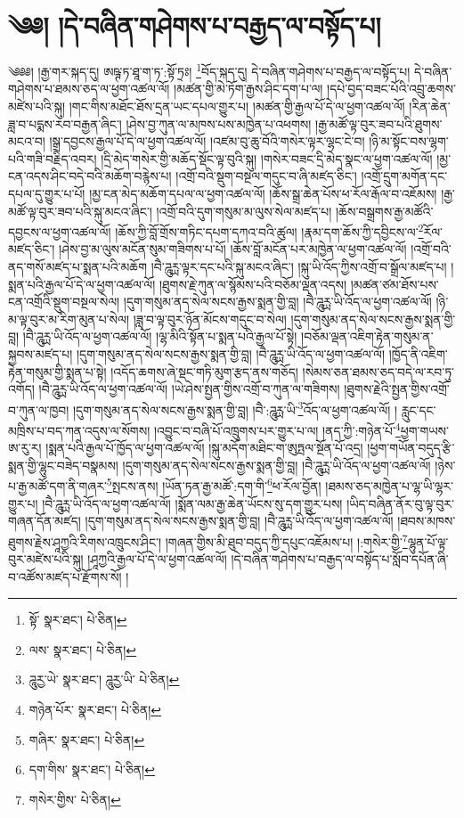 \setcounter{footnote}{0} 
\chapter{༄༅། །དེ་བཞིན་གཤེགས་པ་བརྒྱད་ལ་བསྟོད་པ།}༄༅༅། །རྒྱ་གར་སྐད་དུ། ཨཥྚ་ཏ་ཐཱ་ག་ཏ་:སྟོ་ཏྲཿ། \footnote{སྟོ་  སྣར་ཐང་།  པེ་ཅིན། }བོད་སྐད་དུ། དེ་བཞིན་གཤེགས་པ་བརྒྱད་ལ་བསྟོད་པ། དེ་བཞིན་གཤེགས་པ་ཐམས་ཅད་ལ་ཕྱག་འཚལ་ལོ། །མཚན་གྱི་མེ་ཏོག་རྒྱས་ཤིང་དག་པ་ལ། །དཔེ་བྱད་བཟང་པོའི་འབྲུ་ཆགས་མཛེས་པའི་སྐུ། །གང་གིས་མཐོང་ཐོས་དྲན་ཡང་དཔལ་གྱུར་པ། །མཚན་གྱི་རྒྱལ་པོ་དེ་ལ་ཕྱག་འཚལ་ལོ། །རིན་ཆེན་ཟླ་བ་པདྨས་རབ་བརྒྱན་ཞིང་། །ཤེས་བྱ་ཀུན་ལ་མཁས་པས་མཁྱེན་པ་འཕགས། །རྒྱ་མཚོ་ལྟ་བུར་ཟབ་པའི་ཐུགས་མངའ་བ། །སྒྲ་དབྱངས་རྒྱལ་པོ་དེ་ལ་ཕྱག་འཚལ་ལོ། །འཛམ་བུ་ཆུ་བོའི་གསེར་ལྟར་ལྷང་ངེ་བ། །ཉི་མ་སྟོང་བས་ལྷག་པའི་གཟི་བརྗིད་འབར། །དྲི་མེད་གསེར་གྱི་མཆོད་སྡོང་ལྟ་བུའི་སྐུ། །གསེར་བཟང་དྲི་མེད་སྣང་ལ་ཕྱག་འཚལ་ལོ། །མྱ་ངན་འདས་ཤིང་བདེ་བའི་མཆོག་བརྙེས་པ། །འགྲོ་བའི་སྡུག་བསྔལ་གདུང་བ་ཞི་མཛད་ཅིང་། །འགྲོ་དྲུག་མགོན་དང་དཔལ་དུ་གྱུར་པ་པོ། །མྱ་ངན་མེད་མཆོག་དཔལ་ལ་ཕྱག་འཚལ་ལོ། །ཆོས་སྒྲ་ཆེན་པོས་ཕ་རོལ་རྒོལ་བ་འཇོམས། །རྒྱ་མཚོ་ལྟ་བུར་ཟབ་པའི་སྐུ་མངའ་ཞིང་། །འགྲོ་བའི་དུག་གསུམ་མ་ལུས་སེལ་མཛད་པ། །ཆོས་བསྒྲགས་རྒྱ་མཚོའི་དབྱངས་ལ་ཕྱག་འཚལ་ལོ། །ཆོས་ཀྱི་བློ་གྲོས་གཏིང་དཔག་དཀའ་བའི་ཚུལ། །རྣམ་དག་ཆོས་ཀྱི་དབྱིངས་ལ་\footnote{ལས་  སྣར་ཐང་།  པེ་ཅིན། }རོལ་མཛད་ཅིང་། །ཤེས་བྱ་མ་ལུས་མངོན་སུམ་གཟིགས་པ་པོ། །ཆོས་བློ་མངོན་པར་མཁྱེན་ལ་ཕྱག་འཚལ་ལོ། །འགྲོ་བའི་ནད་གསོ་མཛད་པ་སྨན་པའི་མཆོག །བཻ་ཌཱུཪྻ་ལྟར་དང་པའི་སྐུ་མངའ་ཞིང་། །སྐུ་ཡི་འོད་ཀྱིས་འགྲོ་བ་སྒྲོལ་མཛད་པ། །སྨན་པའི་རྒྱལ་པོ་དེ་ལ་ཕྱག་འཚལ་ལོ། །ཐུགས་རྗེ་ཀུན་ལ་སྙོམས་པའི་བཅོམ་ལྡན་འདས། །མཚན་ཙམ་ཐོས་པས་ངན་འགྲོའི་སྡུག་བསྔལ་སེལ། །དུག་གསུམ་ནད་སེལ་སངས་རྒྱས་སྨན་གྱི་བླ། །བཻ་ཌཱུཪྻ་ཡི་འོད་ལ་ཕྱག་འཚལ་ལོ། །ཉི་མ་ལྟ་བུར་མ་རིག་མུན་པ་སེལ། །ཟླ་བ་ལྟ་བུར་ཉོན་མོངས་གདུང་བ་སེལ། །དུག་གསུམ་ནད་སེལ་སངས་རྒྱས་སྨན་གྱི་བླ། །བཻ་ཌཱུཪྻ་ཡི་འོད་ལ་ཕྱག་འཚལ་ལོ། །ལྷ་མིའི་སྟོན་པ་སྨན་པའི་རྒྱལ་པོ་སྟེ། །བཅོམ་ལྡན་འཇིག་རྟེན་གསུམ་ན་སྐྱབས་མཛད་པ། །དུག་གསུམ་ནད་སེལ་སངས་རྒྱས་སྨན་གྱི་བླ། །བཻ་ཌཱུཪྻ་ཡི་འོད་ལ་ཕྱག་འཚལ་ལོ། །ཁྱོད་ནི་འཇིག་རྟེན་གསུམ་གྱི་སྨན་པ་སྟེ། །འདོད་ཆགས་ཞེ་སྡང་གཏི་མུག་རྩད་ནས་གཅོད། །སེམས་ཅན་ཐམས་ཅད་བདེ་ལ་རབ་ཏུ་འགོད། །བཻ་ཌཱུཪྻ་ཡི་འོད་ལ་ཕྱག་འཚལ་ལོ། །ཡེ་ཤེས་སྤྱན་གྱིས་འགྲོ་བ་ཀུན་ལ་གཟིགས། །ཐུགས་རྗེའི་སྤྱན་གྱིས་འགྲོ་བ་ཀུན་ལ་ཁྱབ། །དུག་གསུམ་ནད་སེལ་སངས་རྒྱས་སྨན་གྱི་བླ། །བཻ་:ཌཱུཪྻ་ཡི་\footnote{ཌཱུརྱ་ཡེ་  སྣར་ཐང་། ཌཱུརྱ་ཡི་  པེ་ཅིན། }འོད་ལ་ཕྱག་འཚལ་ལོ། །
རླུང་དང་མཁྲིས་པ་བད་ཀན་འདུས་ལ་སོགས། །འབྱུང་བ་བཞི་པོ་འཁྲུགས་པར་གྱུར་པ་ལ། །ནད་ཀྱི་:གཉེན་པོ་\footnote{གཉེན་པོར་  སྣར་ཐང་།  པེ་ཅིན། }ཕྱག་གཡས་ཨ་རུ་ར། །སྨན་པའི་རྒྱལ་པོ་ཁྱོད་ལ་ཕྱག་འཚལ་ལོ། །སྐུ་མདོག་མཐིང་ག་ཨུཏྤལ་སྔོན་པོ་འདྲ། །ཕྱག་གཡོན་བདུད་རྩི་སྨན་གྱི་ལྷུང་བཟེད་བསྣམས། །དུག་གསུམ་ནད་སེལ་སངས་རྒྱས་སྨན་གྱི་བླ། །བཻ་ཌཱུཪྻ་ཡི་འོད་ལ་ཕྱག་འཚལ་ལོ། །ཉེས་པ་རྒྱ་མཚོ་དག་ནི་གཞར་\footnote{གཞིར་  སྣར་ཐང་།  པེ་ཅིན། }སྤངས་ནས། །ཡོན་ཏན་རྒྱ་མཚོ་:དག་གི་\footnote{དག་གིས་  སྣར་ཐང་།  པེ་ཅིན། }ཕ་རོལ་བྱོན། །ཐམས་ཅད་མཁྱེན་པ་ལྷ་ཡི་ལྷར་གྱུར་པ། །བཻ་ཌཱུཪྻ་ཡི་འོད་ལ་ཕྱག་འཚལ་ལོ། །སྨོན་ལམ་རྒྱ་ཆེན་ཡོངས་སུ་དག་གྱུར་པས། །ཡིད་བཞིན་ནོར་བུ་ལྟ་བུར་གཞན་དོན་མཛད། །དུག་གསུམ་ནད་སེལ་སངས་རྒྱས་སྨན་གྱི་བླ། །བཻ་ཌཱུཪྻ་ཡི་འོད་ལ་ཕྱག་འཚལ་ལོ། །ཐབས་མཁས་ཐུགས་རྗེས་ཤཱཀྱའི་རིགས་འཁྲུངས་ཤིང་། །གཞན་གྱིས་མི་ཐུབ་བདུད་ཀྱི་དཔུང་འཇོམས་པ། །:གསེར་གྱི་\footnote{གསེར་གྱིས་  པེ་ཅིན། }ལྷུན་པོ་ལྟ་བུར་མཛེས་པའི་སྐུ། །ཤཱཀྱའི་རྒྱལ་པོ་དེ་ལ་ཕྱག་འཚལ་ལོ། །དེ་བཞིན་གཤེགས་པ་བརྒྱད་ལ་བསྟོད་པ་སློབ་དཔོན་ཞི་བ་འཚོས་མཛད་པ་རྫོགས་སོ། ། 
